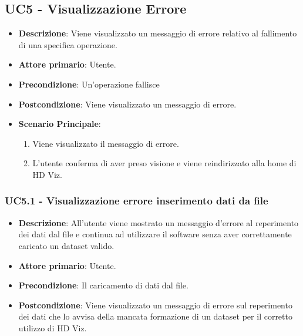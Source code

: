 \newpage
\subsection{UC5 - Visualizzazione Errore}
\label{subsec:uc5}

\begin{itemize}
    \item \textbf{Descrizione}: Viene visualizzato un messaggio di errore relativo al fallimento di una specifica operazione.

    \item \textbf{Attore primario}: Utente.
    
    \item \textbf{Precondizione}:   Un'operazione fallisce

    \item \textbf{Postcondizione}:  Viene visualizzato un messaggio di errore.
    
    \item \textbf{Scenario Principale}:
    \begin{enumerate}
        \item Viene visualizzato il messaggio di errore.
        \item L'utente conferma di aver preso visione e viene reindirizzato alla home di HD Viz.
    \end{enumerate}

\end{itemize}


\subsubsection{UC5.1 - Visualizzazione errore inserimento dati da file}
\label{subsec:uc5.1.1}
\begin{itemize}
    \item \textbf{Descrizione}: All'utente viene mostrato un messaggio d'errore al reperimento
                                dei dati dal file e continua ad utilizzare 
                                il software senza aver correttamente caricato un dataset valido.

    \item \textbf{Attore primario}: Utente.
    
    \item \textbf{Precondizione}:   Il caricamento di dati dal file.

    \item \textbf{Postcondizione}:  Viene visualizzato un messaggio di errore sul reperimento dei 
                                    dati che lo avvisa della mancata formazione di un dataset per il
                                    corretto utilizzo di HD Viz.

\end{itemize}


